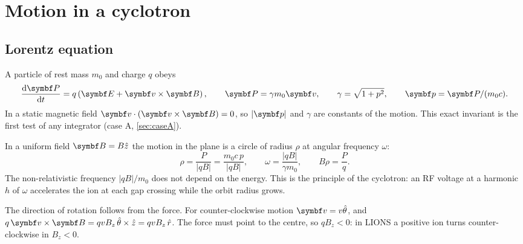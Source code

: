 \chapter{Motion in a cyclotron}\label{ch:motion}

\section{Lorentz equation}
A particle of rest mass $m_0$ and charge $q$ obeys
\begin{equation}
\frac{\dd \vect P}{\dd t} = q\left(\vect E + \vect v\times\vect B\right),\qquad
\vect P = \gamma m_0 \vect v,\qquad \gamma = \sqrt{1+p^2},\qquad \vect p = \vect P/(m_0c).
\label{eq:lorentz}
\end{equation}
In a static magnetic field $\vect v\cdot(\vect v\times\vect B)=0$, so $|\vect p|$ and $\gamma$ are constants of the
motion.
This exact invariant is the first test of any integrator (case A, \cref{sec:caseA}).

In a uniform field $\vect B = B\hat z$ the motion in the plane is a circle of radius $\rho$ at angular frequency
$\omega$:
\begin{equation}
\rho = \frac{P}{|q B|} = \frac{m_0 c\, p}{|qB|},\qquad \omega = \frac{|q B|}{\gamma m_0},
\qquad B\rho = \frac{P}{q}.
\label{eq:cyclotron}
\end{equation}
The non-relativistic frequency $|qB|/m_0$ does not depend on the energy.
This is the principle of the cyclotron: an RF voltage at a harmonic $h$ of $\omega$ accelerates the ion at each gap
crossing while the orbit radius grows.

The direction of rotation follows from the force.
For counter-clockwise motion $\vect v = v\hat\theta$, and $q\,\vect v\times\vect B = q v B_z\,\hat\theta\times\hat z
= q v B_z\,\hat r$.
The force must point to the centre, so $qB_z<0$: in LIONS a positive ion turns counter-clockwise in $B_z<0$.


